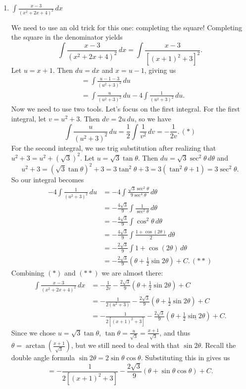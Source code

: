 \documentclass[12pt,oneside,english]{amsart}
\begin{document}
\begin{enumerate}[leftmargin=*]
\item $\displaystyle \int\frac{x-3}{(x^2+2x+4)^2}\,dx$

We need to use an old trick for this one: completing the square! Completing
the square in the denominator yields
\[
\int\frac{x-3}{(x^{2}+2x+4)^{2}}\,dx=\int\frac{x-3}{[(x+1)^{2}+3]^{2}}.
\]
Let $u=x+1$. Then $du=dx$ and $x=u-1$, giving us
\begin{align*}
 & =\int\frac{u-1-3}{(u^{2}+3)^{2}}\,du\\
 & =\int\frac{u}{(u^{2}+3)^{2}}\,du-4\int\frac{1}{(u^{2}+3)^{2}}\,du.
\end{align*}
Now we need to use two tools. Let's focus on the first integral. For
the first integral, let $v=u^{2}+3$. Then $dv=2u\,du$, so we have
\[
\int\frac{u}{(u^{2}+3)^{2}}\,du=\frac{1}{2}\int\frac{1}{v^{2}}\,dv=-\frac{1}{2v}.\,(*)
\]
For the second integral, we use trig substitution after realizing
that $u^{2}+3=u^{2}+(\sqrt{3})^{2}$. Let $u=\sqrt{3}\tan\theta$.
Then $du=\sqrt{3}\sec^{2}\theta\,d\theta$ and 
\[
u^{2}+3=(\sqrt{3}\tan\theta)^{2}+3=3\tan^{2}\theta+3=3(\tan^{2}\theta+1)=3\sec^{2}\theta.
\]
So our integral becomes
\begin{align*}
-4\int\frac{1}{(u^{2}+3)^{2}}\,du & =-4\int\frac{\sqrt{3}\sec^{2}\theta}{9\sec^{4}\theta}\,d\theta\\
 & =-\frac{4\sqrt{3}}{9}\int\frac{1}{\sec^{2}\theta}\,d\theta\\
 & =-\frac{4\sqrt{3}}{9}\int\cos^{2}\theta\,d\theta\\
 & =-\frac{4\sqrt{3}}{9}\int\frac{1+\cos(2\theta)}{2}\,d\theta\\
 & =-\frac{2\sqrt{3}}{9}\int1+\cos(2\theta)\,d\theta\\
 & =-\frac{2\sqrt{3}}{9}\left(\theta+\frac{1}{2}\sin2\theta\right)+C.\,(**)
\end{align*}
Combining $(*)$ and $(**)$ we are almost there:
\begin{align*}
\int\frac{x-3}{(x^{2}+2x+4)^{2}}\,dx & =-\frac{1}{2v}-\frac{2\sqrt{3}}{9}\left(\theta+\frac{1}{2}\sin2\theta\right)+C\\
 & =-\frac{1}{2(u^{2}+3)}-\frac{2\sqrt{3}}{9}\left(\theta+\frac{1}{2}\sin2\theta\right)+C\\
 & =-\frac{1}{2\left[(x+1)^{2}+3\right]}-\frac{2\sqrt{3}}{9}\left(\theta+\frac{1}{2}\underline{\sin2\theta}\right)+C.
\end{align*}
Since we chose $u=\sqrt{3}\tan\theta$, $\tan\theta=\frac{u}{\sqrt{3}}=\frac{x+1}{\sqrt{3}}$,
and thus $\theta=\arctan\left(\frac{x+1}{\sqrt{3}}\right)$, but we
still need to deal with that $\sin2\theta$. Recall the double angle
formula $\sin2\theta=2\sin\theta\cos\theta$. Substituting this in
gives us
\[
=-\frac{1}{2\left[(x+1)^{2}+3\right]}-\frac{2\sqrt{3}}{9}\left(\theta+\sin\theta\cos\theta\right)+C.
\]


\end{enumerate}
\end{document}
